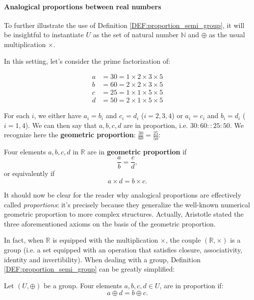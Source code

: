 \paragraph{Analogical proportions between real numbers\\}

To further illustrate the use of Definition \ref{DEF:proportion_semi_group}, it
will be insightful to instantiate $U$ as the set of natural number $\mathbb{N}$
and $\oplus$ as the usual multiplication $\times$.
\begin{testexample}
  In this setting, let's consider the prime factorization of:

  \begin{align*}
    a &= 30 = 1 \times 2 \times 3 \times 5\\
    b &= 60 = 2 \times 2 \times 3 \times 5\\
    c &= 25 = 1 \times 1 \times 5 \times 5\\
    d &= 50 = 2 \times 1 \times 5 \times 5
  \end{align*}

For each $i$, we either have $a_i = b_i$ and $c_i = d_i$ ($i = 2, 3, 4$) or
$a_i = c_i$ and $b_i = d_i$ ($i = 1, 4$). We can then say that $a, b, c, d$ are
in proportion, i.e. $30: 60 :: 25: 50$. We recognize here the \textbf{geometric
  proportion}: $\frac{30}{60} = \frac{25}{50}$:
\end{testexample}

\begin{definition}
  Four elements $a, b, c, d$ in $\mathbb{R}$ are in \textbf{geometric
  proportion} if
  $$\frac{a}{b} = \frac{c}{d},$$
  or equivalently if
  $$a\times d = b\times c.$$
\end{definition}

It should now be clear for the reader why analogical proportions are
effectively called \textit{proportions}: it's precisely because they generalize
the well-known numerical geometric proportion to more complex structures.
Actually, Aristotle stated the three aforementioned axioms on the basis of the
geometric proportion.

In fact, when $\mathbb{R}$ is equipped with the multiplication $\times$, the
couple $(\mathbb{R}, \times)$ is a group (i.e. a set equipped with an operation
that satisfies  closure, associativity, identity and invertibility). When
dealing with a group, Definition \ref{DEF:proportion_semi_group} can be greatly
simplified:

\begin{definition}
  \label{DEF:proportion_group}
Let $(U, \oplus)$ be a group.  Four elements $a, b, c, d \in U$, are in
  proportion if:
  $$a \oplus d = b \oplus c.$$
\end{definition}

